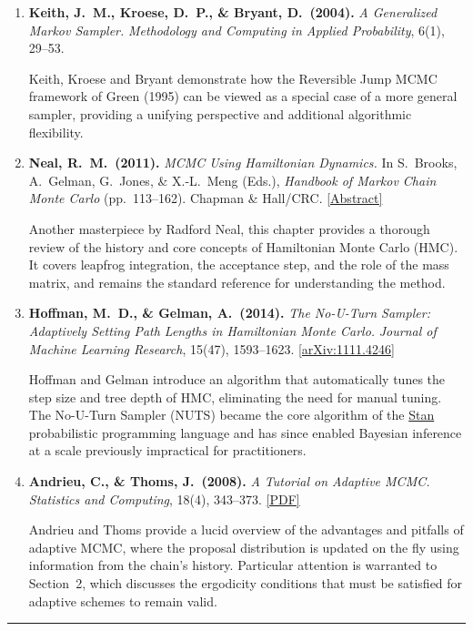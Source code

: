 \documentclass[12pt, a4paper]{article}
\begin{document}
\begin{enumerate}
\item \textbf{Keith, J.~M., Kroese, D.~P., \& Bryant, D.\ (2004).}
\textit{A Generalized Markov Sampler.}
\textit{Methodology and Computing in Applied Probability}, 6(1), 29--53.

Keith, Kroese and Bryant demonstrate how the Reversible Jump MCMC framework of Green (1995) can be viewed as a special case of a more general sampler, providing a unifying perspective and additional algorithmic flexibility.

\item \textbf{Neal, R.~M.\ (2011).}
\textit{MCMC Using Hamiltonian Dynamics.}
In S.~Brooks, A.~Gelman, G.~Jones, \& X.-L.~Meng (Eds.),
\textit{Handbook of Markov Chain Monte Carlo} (pp.~113--162). Chapman \& Hall/CRC.
\href{https://www.cs.utoronto.ca/~radford/ham-mcmc.abstract.html}{[Abstract]}

Another masterpiece by Radford Neal, this chapter provides a thorough review of the history and core concepts of Hamiltonian Monte Carlo (HMC).
It covers leapfrog integration, the acceptance step, and the role of the mass matrix, and remains the standard reference for understanding the method.

\item \textbf{Hoffman, M.~D., \& Gelman, A.\ (2014).}
\textit{The No-U-Turn Sampler: Adaptively Setting Path Lengths in Hamiltonian Monte Carlo.}
\textit{Journal of Machine Learning Research}, 15(47), 1593--1623.
\href{https://arxiv.org/abs/1111.4246}{[arXiv:1111.4246]}

Hoffman and Gelman introduce an algorithm that automatically tunes the step size and tree depth of HMC, eliminating the need for manual tuning.
The No-U-Turn Sampler (NUTS) became the core algorithm of the \href{https://mc-stan.org/}{Stan} probabilistic programming language and has since enabled Bayesian inference at a scale previously impractical for practitioners.

\item \textbf{Andrieu, C., \& Thoms, J.\ (2008).}
\textit{A Tutorial on Adaptive MCMC.}
\textit{Statistics and Computing}, 18(4), 343--373.
\href{https://people.eecs.berkeley.edu/~jordan/sail/readings/andrieu-thoms.pdf}{[PDF]}

Andrieu and Thoms provide a lucid overview of the advantages and pitfalls of adaptive MCMC, where the proposal distribution is updated on the fly using information from the chain's history.
Particular attention is warranted to Section~2, which discusses the ergodicity conditions that must be satisfied for adaptive schemes to remain valid.

\end{enumerate}

\vspace{2em}
\noindent\rule{\textwidth}{0.4pt}
\vspace{0.5em}

\end{document}
